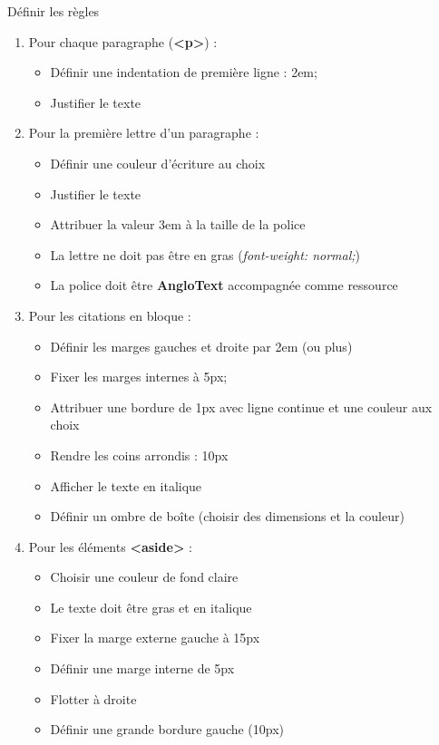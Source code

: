 \documentclass[11pt, a4paper]{article}
\begin{document}
Définir les règles 
\begin{enumerate}
	\item Pour chaque paragraphe (\textbf{<p>}) :
	\begin{multicols}{2}
	\begin{itemize}
		\item Définir une indentation de première ligne : 2em;
		\item Justifier le texte
	\end{itemize} 
	\end{multicols}
	\item Pour la première lettre d'un paragraphe :
	\begin{multicols}{2}
	\begin{itemize}
		\item Définir une couleur d'écriture au choix
		\item Justifier le texte
		\item Attribuer la valeur 3em à la taille de la police
		\item La lettre ne doit pas être en gras (\textit{font-weight: normal;})
		\item La police doit être \textbf{AngloText} accompagnée comme ressource
	\end{itemize} 
	\end{multicols}
	\item Pour les citations en bloque :
	\begin{multicols}{2}
	\begin{itemize}
		\item Définir les marges gauches et droite par 2em (ou plus)
		\item Fixer les marges internes à 5px;
		\item Attribuer une bordure de 1px avec ligne continue et une couleur aux choix
		\item Rendre les coins arrondis : 10px
		\item Afficher le texte en italique 
		\item Définir un ombre de boîte (choisir des dimensions et la couleur)
	\end{itemize} 
	\end{multicols}
	\item Pour les éléments \textbf{<aside>} :
	\begin{multicols}{2}
	\begin{itemize}
		\item Choisir une couleur de fond claire
		\item Le texte doit être gras et en italique
		\item Fixer la marge externe gauche à 15px
		\item Définir une marge interne de 5px
		\item Flotter à droite
		\item Définir une grande bordure gauche (10px)
	\end{itemize} 
	\end{multicols}
\end{enumerate}
\end{document}
